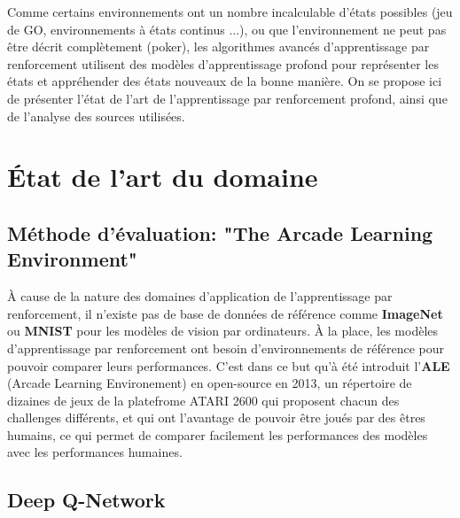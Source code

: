 \documentclass[a4paper,12pt]{article}
\begin{document}
Comme certains environnements ont un nombre incalculable d'états possibles (jeu de GO, environnements à états continus ...), ou que l'environnement ne peut pas être décrit complètement (poker), les algorithmes avancés d'apprentissage par renforcement utilisent des modèles d'apprentissage profond pour représenter les états et appréhender des états nouveaux de la bonne manière. On se propose ici de présenter l'état de l'art de l'apprentissage par renforcement profond, ainsi que de l'analyse des sources utilisées.\par

\medskip
\section{\'Etat de l'art du domaine}


\medskip
\subsection{Méthode d'évaluation: "The Arcade Learning Environment"}

\`A cause de la nature des domaines d'application de l'apprentissage par renforcement, il n'existe pas de base de données de référence comme \textbf{ImageNet} \cite{imagenet} ou \textbf{MNIST} \cite{mnist} pour les modèles de vision par ordinateurs. \`A la place, les modèles d'apprentissage par renforcement ont besoin d'environnements de référence pour pouvoir comparer leurs performances. C'est dans ce but qu'à été introduit l'\textbf{ALE} (Arcade Learning Environement) \cite{bellemare13arcade, arcade2} en open-source en 2013, un répertoire de dizaines de jeux de la platefrome ATARI 2600 qui proposent chacun des challenges différents, et qui ont l'avantage de pouvoir être joués par des êtres humains, ce qui permet de comparer facilement les performances des modèles avec les performances humaines.\par

\medskip
\subsection{Deep Q-Network}
\end{document}
